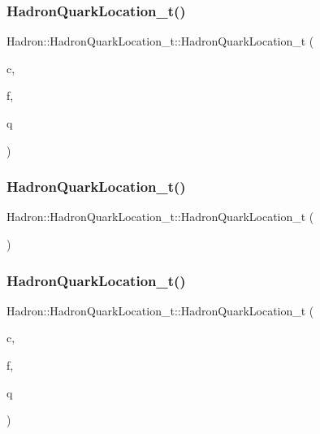 \subsubsection{\texorpdfstring{HadronQuarkLocation\_t()}{HadronQuarkLocation\_t()}\hspace{0.1cm}{\footnotesize\ttfamily [2/6]}}
{\footnotesize\ttfamily Hadron\+::\+Hadron\+Quark\+Location\+\_\+t\+::\+Hadron\+Quark\+Location\+\_\+t (\begin{DoxyParamCaption}\item[{bool}]{c,  }\item[{char}]{f,  }\item[{const \mbox{\hyperlink{structHadron_1_1QuarkNum__t}{Quark\+Num\+\_\+t}} \&}]{q }\end{DoxyParamCaption})\hspace{0.3cm}{\ttfamily [inline]}}

\mbox{\label{structHadron_1_1HadronQuarkLocation__t_a134386bb80be45cf0767a6c45e3b6f52}} 
\subsubsection{\texorpdfstring{HadronQuarkLocation\_t()}{HadronQuarkLocation\_t()}\hspace{0.1cm}{\footnotesize\ttfamily [3/6]}}
{\footnotesize\ttfamily Hadron\+::\+Hadron\+Quark\+Location\+\_\+t\+::\+Hadron\+Quark\+Location\+\_\+t (\begin{DoxyParamCaption}{ }\end{DoxyParamCaption})\hspace{0.3cm}{\ttfamily [inline]}}

\mbox{\label{structHadron_1_1HadronQuarkLocation__t_a214dddf7650dc22b5c424715fc27dd42}} 
\subsubsection{\texorpdfstring{HadronQuarkLocation\_t()}{HadronQuarkLocation\_t()}\hspace{0.1cm}{\footnotesize\ttfamily [4/6]}}
{\footnotesize\ttfamily Hadron\+::\+Hadron\+Quark\+Location\+\_\+t\+::\+Hadron\+Quark\+Location\+\_\+t (\begin{DoxyParamCaption}\item[{bool}]{c,  }\item[{char}]{f,  }\item[{const \mbox{\hyperlink{structHadron_1_1QuarkNum__t}{Quark\+Num\+\_\+t}} \&}]{q }\end{DoxyParamCaption})\hspace{0.3cm}{\ttfamily [inline]}}

